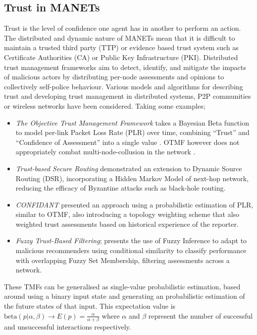 \documentclass[conference]{IEEEtran}
\begin{document}
\subsection{Trust in MANETs}\label{sec:trustinmanets}

Trust is the level of confidence one agent has in another to perform an action. 
The distributed and dynamic nature of MANETs mean that it is difficult to maintain a trusted third party (TTP) or evidence based trust system such as Certificate Authorities (CA) or Public Key Infrastructure (PKI).
Distributed trust management frameworks aim to detect, identify, and mitigate the impacts of malicious actors by distributing per-node assessments and opinions to collectively self-police behaviour.
Various models and algorithms for describing trust and developing trust management in distributed systems, P2P communities or wireless networks have been considered.
Taking some examples;

\begin{itemize}
  \item \emph{The Objective Trust Management Framework} takes a Bayesian Beta function to model per-link Packet Loss Rate (PLR) over time, combining ``Trust'' and ``Confidence of Assessment'' into a single value \cite{Li2008}.
    OTMF however does not appropriately combat multi-node-collusion in the network \cite{Cho2011}.
  \item \emph{Trust-based Secure Routing}\cite{Moe2008a} demonstrated an extension to Dynamic Source Routing (DSR), incorporating a Hidden Markov Model of next-hop network, reducing the efficacy of Byzantine attacks such as black-hole routing.
  \item \emph{CONFIDANT}\cite{Buchegger2002} presented an approach using a probabilistic estimation of PLR, similar to OTMF, also introducing a topology weighting scheme that also weighted trust assessments based on historical experience of the reporter.
  \item \emph{Fuzzy Trust-Based Filtering}; \cite{Luo2008} presents the use of Fuzzy Inference to adapt to malicious recommenders using conditional similarity to classify performance with overlapping Fuzzy Set Membership, filtering assessments across a network.
\end{itemize}

These TMFs can be generalised as single-value probabilistic estimation, based around using a binary input state and generating an probabilistic estimation of the future states of that input. This expectation value is $\text{beta}(p|\alpha,\beta) \to E(p) = \frac{\alpha}{\alpha+\beta}$ where $\alpha$ and $\beta$ represent the number of successful and unsuccessful interactions respectively.
\end{document}
